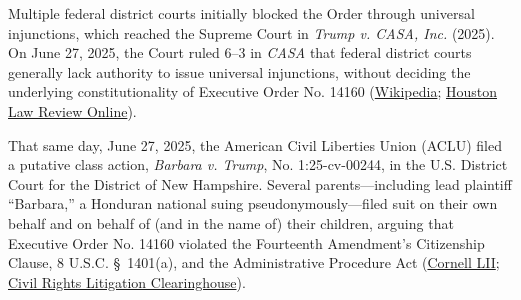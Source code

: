 \documentclass[12pt]{article}
\begin{document}
Multiple federal district courts initially blocked the Order through universal injunctions, which reached the Supreme Court in \textit{Trump v. CASA, Inc.} (2025). On June 27, 2025, the Court ruled 6--3 in \textit{CASA} that federal district courts generally lack authority to issue universal injunctions, without deciding the underlying constitutionality of Executive Order No. 14160 (\href{https://en.wikipedia.org/wiki/Trump_v._Barbara}{Wikipedia}; \href{https://houstonlawreview.org/article/171991-from-universal-injunctions-to-nationwide-classes-what-_barbara-v-trump_-reveals-about-_casa_-s-remedial-framework.pdf}{Houston Law Review Online}).

That same day, June 27, 2025, the American Civil Liberties Union (ACLU) filed a putative class action, \textit{Barbara v. Trump}, No. 1:25-cv-00244, in the U.S. District Court for the District of New Hampshire. Several parents---including lead plaintiff ``Barbara,'' a Honduran national suing pseudonymously---filed suit on their own behalf and on behalf of (and in the name of) their children, arguing that Executive Order No. 14160 violated the Fourteenth Amendment's Citizenship Clause, 8 U.S.C. \S\ 1401(a), and the Administrative Procedure Act (\href{https://www.law.cornell.edu/supremecourt/text/25-365}{Cornell LII}; \href{https://clearinghouse.net/case/46748/}{Civil Rights Litigation Clearinghouse}).
\end{document}
